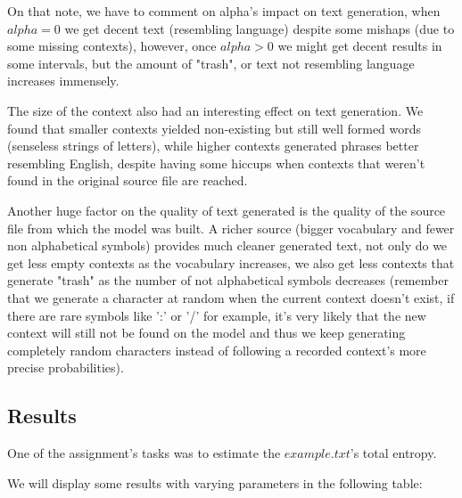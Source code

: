 \documentclass{article}
\begin{document}
	On that note, we have to comment on alpha's impact on text generation, when $alpha=0$ we get decent text (resembling language) despite some mishaps (due to some missing contexts), however, once $alpha>0$ we might get decent results in some intervals, but the amount of "trash", or text not resembling language increases immensely.
	
		The size of the context also had an interesting effect on text generation.
		We found that smaller contexts yielded non-existing but still well formed words (senseless strings of letters), while higher contexts generated phrases better resembling English, despite having some hiccups when contexts that weren't found in the original source file are reached.
		
		Another huge factor on the quality of text generated is the quality of the source file from which the model was built.
		\newpage
		A richer source (bigger vocabulary and fewer non alphabetical symbols) provides much cleaner generated text, not only do we get less empty contexts as the vocabulary increases, we also get less contexts that generate "trash" as the number of not alphabetical symbols decreases (remember that we generate a character at random when the current context doesn't exist, if there are rare symbols like ':' or '/' for example, it's very likely that the new context will still not be found on the model and thus we keep generating completely random characters instead of following a recorded context's more precise probabilities).
	\subsection{Results}
		One of the assignment's tasks was to estimate the $\textit{example.txt}$'s total entropy.  
	
	We will display some results with varying parameters in the following table:
	
\end{document}

